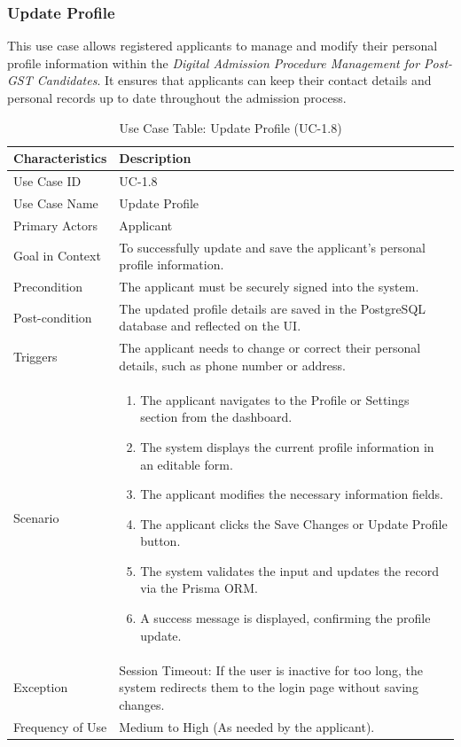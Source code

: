 \subsubsection{Update Profile}

This use case allows registered applicants to manage and modify their personal profile information within the \textit{Digital Admission Procedure Management for Post-GST Candidates}. It ensures that applicants can keep their contact details and personal records up to date throughout the admission process.

\begin{table}[!htbp]
    \centering
    \small
    \renewcommand{\arraystretch}{1.4}
    \caption{Use Case Table: Update Profile (UC-1.8)} %
    \label{tab:use_case_update_profile}
    \begin{tabularx}{\textwidth}{|l|X|}
        \hline
        \rowcolor[gray]{0.9} {Characteristics} & {Description} \\ \hline
        Use Case ID & UC-1.8 \\ \hline
        Use Case Name & Update Profile \\ \hline
        Primary Actors & Applicant \\ \hline
        Goal in Context & To successfully update and save the applicant's personal profile information. \\ \hline
        Precondition & The applicant must be securely signed into the system. \\ \hline
        Post-condition & The updated profile details are saved in the PostgreSQL database and reflected on the UI. \\ \hline
        Triggers & The applicant needs to change or correct their personal details, such as phone number or address. \\ \hline
        Scenario & 
        \begin{enumerate}[nosep, leftmargin=*]
            \item The applicant navigates to the {Profile} or {Settings} section from the dashboard.
            \item The system displays the current profile information in an editable form.
            \item The applicant modifies the necessary information fields.
            \item The applicant clicks the {Save Changes} or {Update Profile} button.
            \item The system validates the input and updates the record via the Prisma ORM.
            \item A success message is displayed, confirming the profile update.
        \end{enumerate} \\ \hline
        Exception & {Session Timeout:} If the user is inactive for too long, the system redirects them to the login page without saving changes. \\ \hline
        Frequency of Use & Medium to High (As needed by the applicant). \\ \hline
    \end{tabularx}
\end{table}
\FloatBarrier